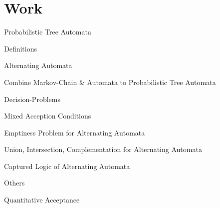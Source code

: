 \documentclass{scrartcl}
\begin{document}
\section{Work}
\begin{checklist}
\item Probabilistic Tree Automata
  \begin{checklist}
  \item Definitions
    \begin{checklist}
    \item Alternating Automata
    \item Combine Markov-Chain \& Automata to Probabilistic Tree Automata
    \end{checklist}
  \item Decision-Problems
    \begin{checklist}
    \item Mixed Acception Conditions
    \item Emptiness Problem for Alternating Automata
    \item Union, Intersection, Complementation for Alternating Automata
    \item Captured Logic of Alternating Automata
    \end{checklist}
  \item Others
    \begin{checklist}
    \item Quantitative Acceptance
    \end{checklist}
  \end{checklist}
\end{checklist}
\end{document}
